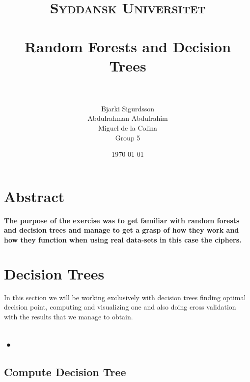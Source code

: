 \documentclass[paper=a4, fontsize=11pt]{scrartcl} %
\title{	
\normalfont \normalsize 
\textsc{Syddansk Universitet} \\ [25pt] 
\horrule{0.5pt} \\[0.4cm] %
\huge Random Forests and Decision Trees \\ %
\horrule{2pt} \\[0.5cm] %
}
\author{Bjarki Sigurdsson \\ Abdulrahman Abdulrahim \\ Miguel de la Colina \\ Group 5}
\date{\normalsize\today} %
\begin{document}
\maketitle %



\section*{Abstract}

\paragraph{The purpose of the exercise was to get familiar with random forests and decision trees and manage to get a grasp of how they work and how they function when using real data-sets in this case the ciphers.}




\section{Decision Trees}
In this section we will be working exclusively with decision trees finding optimal decision point, computing and visualizing one and also doing cross validation with the results that we manage to obtain. 

\subsection{•}

\subsection{Compute Decision Tree}
\end{document}
